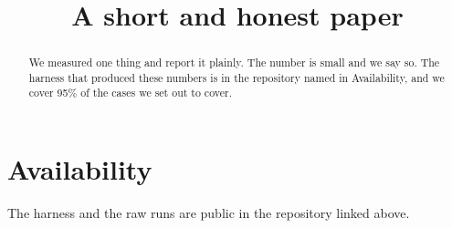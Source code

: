 \documentclass[sigconf,screen]{acmart}
\begin{document}
\title{A short and honest paper}

\begin{abstract}
We measured one thing and report it plainly. The number is small and we say so.
The harness that produced these numbers is in the repository named in Availability,
and we cover 95\% of the cases we set out to cover.
\end{abstract}

\section{Availability}
The harness and the raw runs are public in the repository linked above.
\end{document}
